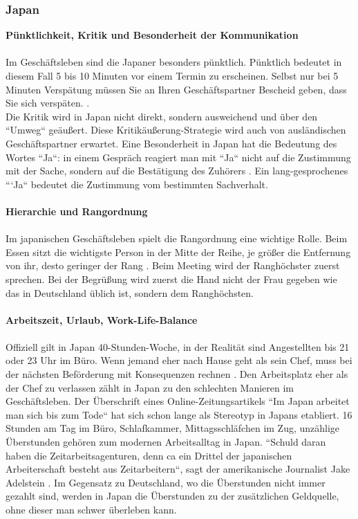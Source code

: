 	\subsubsection{Japan}
	\textbf{Pünktlichkeit, Kritik und Besonderheit der Kommunikation}\\
	\\
	Im Geschäftsleben sind die Japaner besonders pünktlich. Pünktlich bedeutet in diesem Fall 5 bis 10 Minuten vor einem Termin zu erscheinen. Selbst nur bei 5 Minuten Verspätung müssen Sie an Ihren Geschäftspartner Bescheid geben, dass Sie sich verspäten. \cite{JPKnigge}. \\
	Die Kritik wird in Japan nicht direkt, sondern ausweichend und über den ``Umweg`` geäußert. Diese Kritikäußerung-Strategie wird auch von ausländischen Geschäftspartner erwartet. Eine Besonderheit in Japan hat die Bedeutung des Wortes ``Ja``: in einem Gespräch reagiert man mit ``Ja`` nicht auf die Zustimmung mit der Sache, sondern auf die Bestätigung des Zuhörers \cite{JPKnigge}. Ein lang-gesprochenes ```Ja`` bedeutet die Zustimmung vom bestimmten Sachverhalt.\\
	\\
	\textbf{Hierarchie und Rangordnung}\\
	\\
	Im japanischen Geschäftsleben spielt die Rangordnung eine wichtige Rolle.
	Beim Essen sitzt die wichtigste Person in der Mitte der Reihe, je größer die Entfernung von ihr, desto geringer der Rang \cite{Business-KniggeFernost}.	
	Beim Meeting wird der Ranghöchster zuerst sprechen. Bei der Begrüßung wird zuerst die Hand nicht der Frau gegeben wie das in Deutschland üblich ist, sondern dem Ranghöchsten. \\
	\\
	\textbf{Arbeitszeit, Urlaub, Work-Life-Balance}\\
	\\
	Offiziell gilt in Japan 40-Stunden-Woche, in der Realität sind Angestellten bis 21 oder 23 Uhr im Büro. Wenn jemand eher nach Hause geht als sein Chef, muss bei der nächsten Beförderung mit Konsequenzen rechnen \cite{ArbZeitJP}. Den Arbeitsplatz eher als der Chef zu verlassen zählt in Japan zu den schlechten Manieren im Geschäftsleben.
	Der Überschrift eines Online-Zeitungsartikels ``Im Japan arbeitet man sich bis zum Tode`` hat sich schon lange als Stereotyp in Japans etabliert. 
	16 Stunden am Tag im Büro, Schlafkammer, Mittagsschläfchen im Zug, unzählige Überstunden gehören zum modernen Arbeitsalltag in Japan. ``Schuld daran haben die Zeitarbeitsagenturen, denn ca ein Drittel der japanischen Arbeiterschaft besteht aus Zeitarbeitern``, sagt der amerikanische Journalist Jake Adelstein \cite{JPArbeit}. Im Gegensatz zu Deutschland, wo die Überstunden nicht immer gezahlt sind, werden in Japan die Überstunden zu der zusätzlichen Geldquelle, ohne dieser man schwer überleben kann.

